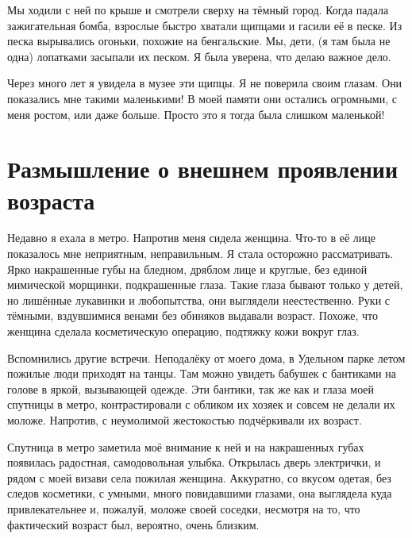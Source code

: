Мы ходили с ней по крыше и смотрели сверху на тёмный город.
Когда падала зажигательная бомба, взрослые быстро хватали щипцами и гасили её в песке.
Из песка вырывались огоньки, похожие на бенгальские.
Мы, дети, (я там была не одна) лопатками засыпали их песком.
Я была уверена, что делаю важное дело.

Через много лет я увидела в музее эти щипцы.
Я не поверила своим глазам.
Они показались мне такими маленькими!
В моей памяти они остались огромными, с меня ростом, или даже больше.
Просто это я тогда была слишком маленькой!


\section*{Размышление о внешнем проявлении\\  возраста}

Недавно я ехала в метро.
Напротив меня сидела женщина.
Что-то в её лице показалось мне неприятным, неправильным.
Я стала осторожно рассматривать.
Ярко накрашенные губы на бледном, дряблом лице и круглые, без единой мимической морщинки, подкрашенные глаза.
Такие глаза бывают только у детей, но лишённые лукавинки и любопытства, они выглядели неестественно.
Руки с тёмными, вздувшимися венами без обиняков выдавали возраст.
Похоже, что женщина сделала косметическую операцию, подтяжку кожи вокруг глаз.

Вспомнились другие встречи.
Неподалёку от моего дома, в Удельном парке летом пожилые люди приходят на танцы.
Там можно увидеть бабушек с бантиками на голове в яркой, вызывающей одежде.
Эти бантики, так же как и глаза моей спутницы в метро, контрастировали с обликом их хозяек и совсем не делали их моложе.
Напротив, с неумолимой жестокостью подчёркивали их возраст.

Спутница в метро заметила моё внимание к ней и на накрашенных губах появилась радостная, самодовольная улыбка.
Открылась дверь электрички, и рядом с моей визави села пожилая женщина.
Аккуратно, со вкусом одетая, без следов косметики, с умными, много повидавшими глазами, она выглядела куда привлекательнее и, пожалуй, моложе своей соседки, несмотря на то, что фактический возраст был, вероятно, очень близким.
